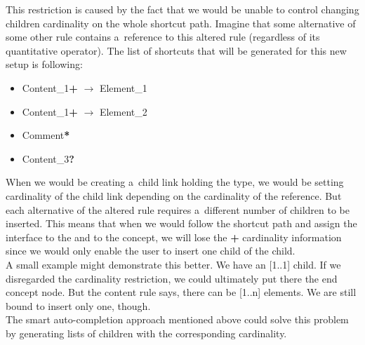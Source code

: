 This restriction is caused by the fact that we would be unable to control changing children cardinality on the whole shortcut path.
Imagine that some alternative of some other rule contains a~reference to this altered  rule (regardless of its quantitative operator).
The list of shortcuts that will be generated for this new setup is following:

\begin{itemize}
	\itemsep0em
	\item Content{\_}1\textbf{+} $\rightarrow$ Element{\_}1
	\item Content{\_}1\textbf{+} $\rightarrow$ Element{\_}2
	\item Comment\textbf{*}
	\item Content{\_}3\textbf{?}
\end{itemize}

When we would be creating a~child link holding the  type, we would be setting cardinality of the child link depending on the cardinality of the  reference.
But each alternative of the altered  rule requires a~different number of children to be inserted.
This means that when we would follow the shortcut path and assign the  interface to the  and to the  concept, we will lose the \textbf{+} cardinality information since we would only enable the user to insert one child of the  child.
\\

A small example might demonstrate this better.
We have an  [1..1] child.
If we disregarded the cardinality restriction, we could ultimately put there the  end concept node.
But the content rule says, there can be [1..n] elements.
We are still bound to insert only one, though.
\\

The smart auto-completion approach mentioned above could solve this problem by generating lists of children with the corresponding cardinality.
